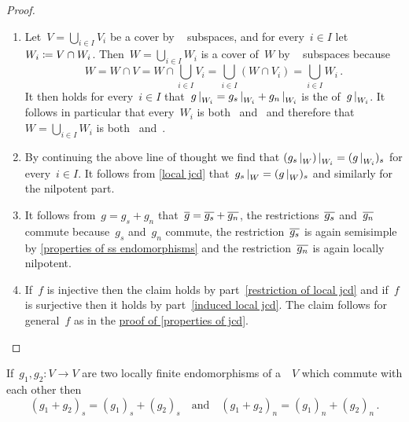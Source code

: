 \begin{proof}
  \leavevmode
  \begin{enumerate}
    \item
      Let~$V = \bigcup_{i \in I} V_i$ be a cover by ~ subspaces, and for every~$i \in I$ let~$W_i \coloneqq V \cap W_i$.
      Then~$W = \bigcup_{i \in I} W_i$ is a cover of~$W$ by ~ subspaces because
      \[
          W 
        = W \cap V
        = W \cap \bigcup_{i \in I} V_i
        = \bigcup_{i \in I} (W \cap V_i)
        = \bigcup_{i \in I} W_i \,.
      \]
      It then holds for every~$i \in I$ that~$\restrict{g}{W_i} = \restrict{g_s}{W_i} + \restrict{g_n}{W_i}$ is the {\JCD} of~$\restrict{g}{W_i}$.
      It follows in particular that every~$W_i$ is both~ and~ and therefore that~$W = \bigcup_{i \in I} W_i$ is both~ and~.
    \item
      By continuing the above line of thought we find that $\restrict{(\restrict{g_s}{W})}{W_i} = (\restrict{g}{W_i})_s$ for every~$i \in I$.
      It follows from \cref{local jcd} that~$\restrict{g_s}{W} = ( \restrict{g}{W} )_s$ and similarly for the nilpotent part.
    \item
      It follows from~$g = g_s + g_n$ that~$\overline{g} = \overline{g_s} + \overline{g_n}$, the restrictions~$\overline{g_s}$ and~$\overline{g_n}$ commute because~$g_s$ and~$g_n$ commute, the restriction~$\overline{g_s}$ is again semisimple by \cref{properties of ss endomorphisms} and the restriction~$\overline{g_n}$ is again locally nilpotent.
    \item
      If~$f$ is injective then the claim holds by part~\ref*{restriction of local jcd} and if~$f$ is surjective then it holds by part~\ref*{induced local jcd}.
      The claim follows for general~$f$ as in the \hyperref[properties of jcd proof]{proof of \cref{properties of jcd}}.
    \qedhere
  \end{enumerate}
\end{proof}


\begin{lemma}
  If~$g_1, g_2 \colon V \to V$ are two locally finite endomorphisms of a~~$V$ which commute with each other then
  \[
      (g_1 + g_2)_s
    = (g_1)_s + (g_2)_s
    \quad\text{and}\quad
      (g_1 + g_2)_n
    = (g_1)_n + (g_2)_n \,.
  \]
\end{lemma}


